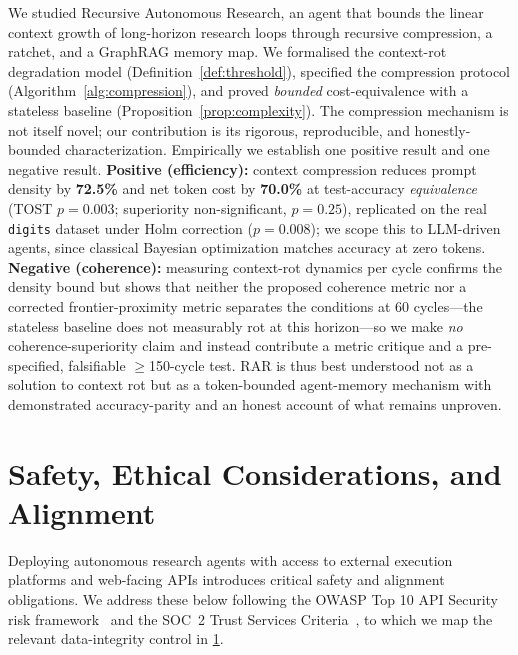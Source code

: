 \documentclass[conference]{IEEEtran}
\begin{document}
We studied Recursive Autonomous Research, an agent that bounds the linear context growth of long-horizon research loops through recursive compression, a ratchet, and a GraphRAG memory map. We formalised the context-rot degradation model (Definition~\ref{def:threshold}), specified the compression protocol (Algorithm~\ref{alg:compression}), and proved \emph{bounded} cost-equivalence with a stateless baseline (Proposition~\ref{prop:complexity}). The compression mechanism is not itself novel; our contribution is its rigorous, reproducible, and honestly-bounded characterization. Empirically we establish one positive result and one negative result. \textbf{Positive (efficiency):} context compression reduces prompt density by \textbf{72.5\%} and net token cost by \textbf{70.0\%} at test-accuracy \emph{equivalence} (TOST $p{=}0.003$; superiority non-significant, $p{=}0.25$), replicated on the real \texttt{digits} dataset under Holm correction ($p{=}0.008$); we scope this to LLM-driven agents, since classical Bayesian optimization matches accuracy at zero tokens. \textbf{Negative (coherence):} measuring context-rot dynamics per cycle confirms the density bound but shows that neither the proposed coherence metric nor a corrected frontier-proximity metric separates the conditions at 60 cycles---the stateless baseline does not measurably rot at this horizon---so we make \emph{no} coherence-superiority claim and instead contribute a metric critique and a pre-specified, falsifiable $\geq$150-cycle test. RAR is thus best understood not as a solution to context rot but as a token-bounded agent-memory mechanism with demonstrated accuracy-parity and an honest account of what remains unproven.

\section{Safety, Ethical Considerations, and Alignment}
\label{sec:safety}

Deploying autonomous research agents with access to external execution platforms and web-facing APIs introduces critical safety and alignment obligations. We address these below following the OWASP Top 10 API Security risk framework~\citep{owasp2023api} and the SOC~2 Trust Services Criteria~\citep{aicpa2017tsc}, to which we map the relevant data-integrity control in \cref{sec:safety}.
\end{document}
